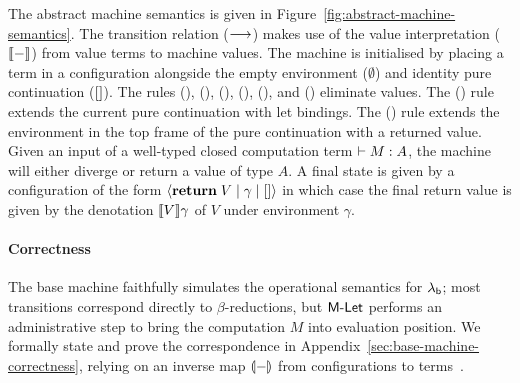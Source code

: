 \documentclass[12pt,phd,lfcs,twoside,openright,logo,leftchapter,normalheadings]{infthesis}
\theoremstyle{plain}
\theoremstyle{definition}
\begin{document}
The abstract machine semantics is given in
Figure~\ref{fig:abstract-machine-semantics}.
%
The transition relation ($\longrightarrow$) makes use of the value
interpretation ($\val{-}$) from value terms to machine values.
%
The machine is initialised by placing a term in a configuration
alongside the empty environment ($\emptyset$) and identity
pure continuation ($[]$).
%
The rules (), (), (), (),
(), and () eliminate values.
%
The () rule extends the current pure continuation with let
bindings.
%
The () rule extends the environment in the top frame of
the pure continuation with a returned value.
%
Given an input of a well-typed closed computation term $\vdash M :
  A$, the machine will either diverge or return a value of type $A$.
%
A final state is given by a configuration of the form $\langle \mathbf{return}\;V
  \mid \gamma \mid [] \rangle$ in which case the final return value is given
by the denotation $\llbracket V \rrbracket \gamma$ of $V$ under environment $\gamma$.
%

\paragraph{Correctness}
%
The base machine faithfully simulates the operational semantics for
$\lambda_{\mathsf{b}}$; most transitions correspond directly to $\beta$-reductions,
but $\mathsf{M\textrm{-}Let}$ performs an administrative step to bring the
computation $M$ into evaluation position.
%
We formally state and prove the correspondence in
Appendix~\ref{sec:base-machine-correctness}, relying on an
inverse map $\llparenthesis - \rrparenthesis$ from configurations to
terms~\citep{HillerstromLA20}.
%
\newcommand{\contapp}[2]{#1 #2}
\newcommand{\contappp}[2]{#1(#2)}
\end{document}
